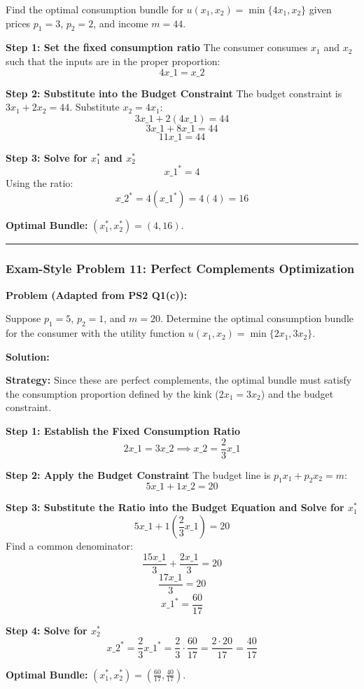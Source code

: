 \documentclass{article}
\begin{document}
Find the optimal consumption bundle for $u(x_1, x_2) = \min\{4x_1, x_2\}$ given prices $p_1=3$, $p_2=2$, and income $m=44$.

\textbf{Step 1: Set the fixed consumption ratio}
The consumer consumes $x_1$ and $x_2$ such that the inputs are in the proper proportion:
\[ 4x\_1 = x\_2 \]

\textbf{Step 2: Substitute into the Budget Constraint}
The budget constraint is $3x_1 + 2x_2 = 44$. Substitute $x_2 = 4x_1$:
\[ 3x\_1 + 2(4x\_1) = 44 \]
\[ 3x\_1 + 8x\_1 = 44 \]
\[ 11x\_1 = 44 \]

\textbf{Step 3: Solve for $x_1^*$ and $x_2^*$}
\[ x\_1^* = 4 \]
Using the ratio:
\[ x\_2^* = 4(x\_1^*) = 4(4) = 16 \]

\textbf{Optimal Bundle:} $(x_1^*, x_2^*) = (4, 16)$.

\medskip\noindent\rule{\linewidth}{0.4pt}\medskip

\subsubsection*{Exam-Style Problem 11: Perfect Complements Optimization}

\textbf{Problem (Adapted from PS2 Q1(c)):}

Suppose $p_1 = 5$, $p_2 = 1$, and $m = 20$. Determine the optimal consumption bundle for the consumer with the utility function $u(x_1, x_2) = \min\{2x_1, 3x_2\}$.

\textbf{Solution:}

\textbf{Strategy:} Since these are perfect complements, the optimal bundle must satisfy the consumption proportion defined by the kink ($2x_1 = 3x_2$) and the budget constraint.

\textbf{Step 1: Establish the Fixed Consumption Ratio}
\[ 2x\_1 = 3x\_2 \implies x\_2 = \frac{2}{3} x\_1 \]

\textbf{Step 2: Apply the Budget Constraint}
The budget line is $p_1 x_1 + p_2 x_2 = m$:
\[ 5x\_1 + 1x\_2 = 20 \]

\textbf{Step 3: Substitute the Ratio into the Budget Equation and Solve for $x_1^*$}
\[ 5x\_1 + 1\left(\frac{2}{3} x\_1\right) = 20 \]
Find a common denominator:
\[ \frac{15x\_1}{3} + \frac{2x\_1}{3} = 20 \]
\[ \frac{17x\_1}{3} = 20 \]
\[ x\_1^* = \frac{60}{17} \]

\textbf{Step 4: Solve for $x_2^*$}
\[ x\_2^* = \frac{2}{3} x\_1^* = \frac{2}{3} \cdot \frac{60}{17} = \frac{2 \cdot 20}{17} = \frac{40}{17} \]

\textbf{Optimal Bundle:} $(x_1^*, x_2^*) = \left(\frac{60}{17}, \frac{40}{17}\right)$.
\end{document}
